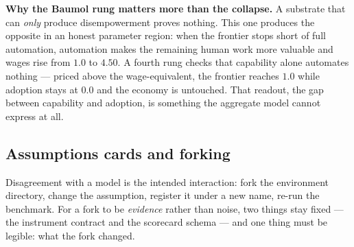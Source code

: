\documentclass[11pt]{article}
\begin{document}
\begin{center}
\end{center}

\noindent \textbf{Why the Baumol rung matters more than the collapse.} A substrate that can
\emph{only} produce disempowerment proves nothing. This one produces the opposite in an
honest parameter region: when the frontier stops short of full automation, automation makes
the remaining human work more valuable and wages rise from $1.0$ to $4.50$. A fourth rung
checks that capability alone automates nothing --- priced above the wage-equivalent, the
frontier reaches $1.0$ while adoption stays at $0.0$ and the economy is untouched. That
readout, the gap between capability and adoption, is something the aggregate model cannot
express at all.

\subsection{Assumptions cards and forking}

Disagreement with a model is the intended interaction: fork the environment directory,
change the assumption, register it under a new name, re-run the benchmark. For a fork to be
\emph{evidence} rather than noise, two things stay fixed --- the instrument contract and the
scorecard schema --- and one thing must be legible: what the fork changed.
\end{document}
